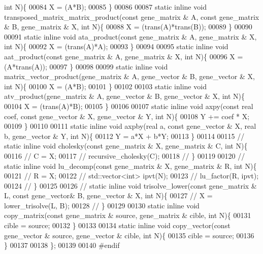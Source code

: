\begin{DoxyCode}
{      int} N)\{
00084     X = (A*B);
00085   \}
00086 
00087   \textcolor{keyword}{static} \textcolor{keyword}{inline} \textcolor{keywordtype}{void} transposed\_matrix\_matrix\_product(\textcolor{keyword}{const} gene\_matrix & A, \textcolor{keyword}{const} gene\_matrix & B, 
      gene\_matrix & X, \textcolor{keywordtype}{int} N)\{
00088     X = (trans(A)*trans(B));
00089   \}
00090 
00091   \textcolor{keyword}{static} \textcolor{keyword}{inline} \textcolor{keywordtype}{void} ata\_product(\textcolor{keyword}{const} gene\_matrix & A, gene\_matrix & X, \textcolor{keywordtype}{int} N)\{
00092     X = (trans(A)*A);
00093   \}
00094 
00095   \textcolor{keyword}{static} \textcolor{keyword}{inline} \textcolor{keywordtype}{void} aat\_product(\textcolor{keyword}{const} gene\_matrix & A, gene\_matrix & X, \textcolor{keywordtype}{int} N)\{
00096     X = (A*trans(A));
00097   \}
00098 
00099   \textcolor{keyword}{static} \textcolor{keyword}{inline} \textcolor{keywordtype}{void} matrix\_vector\_product(gene\_matrix & A, gene\_vector & B, gene\_vector & X, \textcolor{keywordtype}{int} N)\{
00100     X = (A*B);
00101   \}
00102 
00103   \textcolor{keyword}{static} \textcolor{keyword}{inline} \textcolor{keywordtype}{void} atv\_product(gene\_matrix & A, gene\_vector & B, gene\_vector & X, \textcolor{keywordtype}{int} N)\{
00104     X = (trans(A)*B);
00105   \}
00106 
00107   \textcolor{keyword}{static} \textcolor{keyword}{inline} \textcolor{keywordtype}{void} axpy(\textcolor{keyword}{const} real coef, \textcolor{keyword}{const} gene\_vector & X, gene\_vector & Y, \textcolor{keywordtype}{int} N)\{
00108     Y += coef * X;
00109   \}
00110 
00111   \textcolor{keyword}{static} \textcolor{keyword}{inline} \textcolor{keywordtype}{void} axpby(real a, \textcolor{keyword}{const} gene\_vector & X, real b, gene\_vector & Y, \textcolor{keywordtype}{int} N)\{
00112     Y = a*X + b*Y;
00113   \}
00114 
00115 \textcolor{comment}{//   static inline void cholesky(const gene\_matrix & X, gene\_matrix & C, int N)\{}
00116 \textcolor{comment}{//     C = X;}
00117 \textcolor{comment}{//     recursive\_cholesky(C);}
00118 \textcolor{comment}{//   \}}
00119 
00120 \textcolor{comment}{//   static inline void lu\_decomp(const gene\_matrix & X, gene\_matrix & R, int N)\{}
00121 \textcolor{comment}{//     R = X;}
00122 \textcolor{comment}{//     std::vector<int> ipvt(N);}
00123 \textcolor{comment}{//     lu\_factor(R, ipvt);}
00124 \textcolor{comment}{//   \}}
00125 
00126 \textcolor{comment}{//   static inline void trisolve\_lower(const gene\_matrix & L, const gene\_vector& B, gene\_vector & X, int
       N)\{}
00127 \textcolor{comment}{//     X = lower\_trisolve(L, B);}
00128 \textcolor{comment}{//   \}}
00129 
00130   \textcolor{keyword}{static} \textcolor{keyword}{inline} \textcolor{keywordtype}{void} copy\_matrix(\textcolor{keyword}{const} gene\_matrix & source, gene\_matrix & cible, \textcolor{keywordtype}{int} N)\{
00131     cible = source;
00132   \}
00133 
00134   \textcolor{keyword}{static} \textcolor{keyword}{inline} \textcolor{keywordtype}{void} copy\_vector(\textcolor{keyword}{const} gene\_vector & source, gene\_vector & cible, \textcolor{keywordtype}{int} N)\{
00135     cible = source;
00136   \}
00137 
00138 \};
00139 
00140 \textcolor{preprocessor}{#endif}
\end{DoxyCode}
